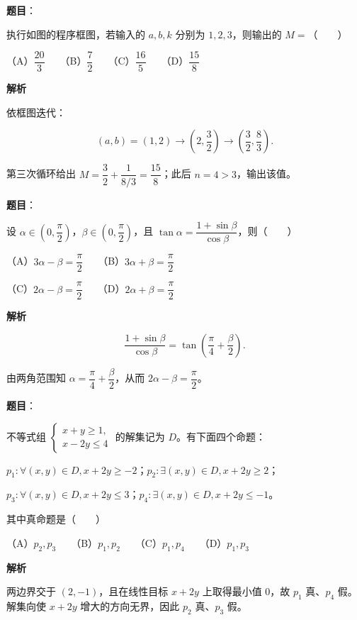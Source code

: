 \begin{answer}

\textbf{题目}：

执行如图的程序框图，若输入的 $a,b,k$ 分别为 $1,2,3$，则输出的 $M=$\mbox{（　　）}
\nopagebreak[4]
\begin{center}\end{center}
\nopagebreak[4]
（A）$\dfrac{20}{3}$　　（B）$\dfrac72$　　（C）$\dfrac{16}{5}$　　（D）$\dfrac{15}{8}$

\textbf{解析}

依框图迭代：

\nopagebreak[4]
\[
(a,b)=(1,2)\to\left(2,\frac32\right)\to\left(\frac32,\frac83\right).
\]

第三次循环给出 $M=\dfrac32+\dfrac1{8/3}=\dfrac{15}{8}$；此后 $n=4>3$，输出该值。


\end{answer}
\begin{answer}

\textbf{题目}：

设 $\alpha\in(0,\dfrac\pi2)$，$\beta\in(0,\dfrac\pi2)$，且 $\tan\alpha=\dfrac{1+\sin\beta}{\cos\beta}$，则\mbox{（　　）}

（A）$3\alpha-\beta=\dfrac\pi2$　　（B）$3\alpha+\beta=\dfrac\pi2$

（C）$2\alpha-\beta=\dfrac\pi2$　　（D）$2\alpha+\beta=\dfrac\pi2$

\textbf{解析}

\nopagebreak[4]
\[
\frac{1+\sin\beta}{\cos\beta}=\tan\left(\frac\pi4+\frac\beta2\right).
\]

由两角范围知 $\alpha=\dfrac\pi4+\dfrac\beta2$，从而 $2\alpha-\beta=\dfrac\pi2$。


\end{answer}
\begin{answer}

\textbf{题目}：

不等式组 $\begin{cases}x+y\geqslant1,\\x-2y\leqslant4\end{cases}$ 的解集记为 $D$。有下面四个命题：

$p_1:\forall(x,y)\in D,x+2y\geqslant-2$；$p_2:\exists(x,y)\in D,x+2y\geqslant2$；

$p_3:\forall(x,y)\in D,x+2y\leqslant3$；$p_4:\exists(x,y)\in D,x+2y\leqslant-1$。

其中真命题是\mbox{（　　）}

（A）$p_2,p_3$　　（B）$p_1,p_2$　　（C）$p_1,p_4$　　（D）$p_1,p_3$

\textbf{解析}

两边界交于 $(2,-1)$，且在线性目标 $x+2y$ 上取得最小值 $0$，故 $p_1$ 真、$p_4$ 假。解集向使 $x+2y$ 增大的方向无界，因此 $p_2$ 真、$p_3$ 假。


\end{answer}
